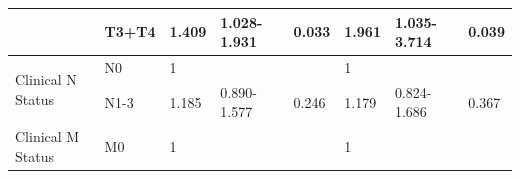 \documentclass[cancers,article,submit,moreauthors,pdftex]{Definitions/mdpi}
\begin{document}
\begin{table}[!hp]
{\begin{tabular}{|l|l|l|l|l|l|l|l|}
\cline{2-8}
                                        & T3+T4                                                                               & 1.409                                                                          & 1.028-1.931                                                                   & \textcolor[rgb]{1,0.149,0}{0.033}                                             & 1.961                                                                          & 1.035-3.714                                                                   & \textcolor[rgb]{1,0.149,0}{0.039}                                              \\ 
\hline
\multirow{2}{*}{Clinical N Status}      & {\cellcolor[rgb]{0.62,0.812,0.878}}N0                                               & {\cellcolor[rgb]{0.62,0.812,0.878}}1                                           & {\cellcolor[rgb]{0.62,0.812,0.878}}                                           & {\cellcolor[rgb]{0.62,0.812,0.878}}                                           & {\cellcolor[rgb]{0.62,0.812,0.878}}1                                           & {\cellcolor[rgb]{0.62,0.812,0.878}}                                           & {\cellcolor[rgb]{0.62,0.812,0.878}}                                            \\ 
\cline{2-8}
                                        & N1-3                                                                                & 1.185                                                                          & 0.890-1.577                                                                   & 0.246                                                                         & 1.179                                                                          & 0.824-1.686                                                                   & 0.367                                                                          \\ 
\hline
\multirow{2}{*}{Clinical M Status}      & {\cellcolor[rgb]{0.62,0.812,0.878}}M0                                               & {\cellcolor[rgb]{0.62,0.812,0.878}}1                                           & {\cellcolor[rgb]{0.62,0.812,0.878}}                                           & {\cellcolor[rgb]{0.62,0.812,0.878}}                                           & {\cellcolor[rgb]{0.62,0.812,0.878}}1                                           & {\cellcolor[rgb]{0.62,0.812,0.878}}                                           & {\cellcolor[rgb]{0.62,0.812,0.878}}                                            \\ 

\end{tabular}}
\end{table}
\end{document}
